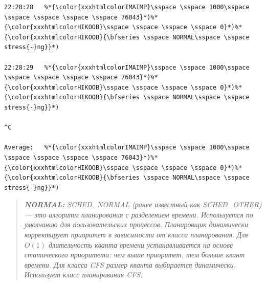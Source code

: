 {\begin{lstlisting}
22:28:28   %*{\color{xxxhtmlcolorIMAIMP}\sspace \sspace 1000\sspace \sspace \sspace \sspace \sspace 76043}*)%*{\color{xxxhtmlcolorHIKOOB}\sspace \sspace \sspace \sspace 0}*)%*{\color{xxxhtmlcolorHIKOOB}{\bfseries \sspace NORMAL\sspace \sspace stress{-}ng}}*)

22:28:29   %*{\color{xxxhtmlcolorIMAIMP}\sspace \sspace 1000\sspace \sspace \sspace \sspace \sspace 76043}*)%*{\color{xxxhtmlcolorHIKOOB}\sspace \sspace \sspace \sspace 0}*)%*{\color{xxxhtmlcolorHIKOOB}{\bfseries \sspace NORMAL\sspace \sspace stress{-}ng}}*)

^C

Average:   %*{\color{xxxhtmlcolorIMAIMP}\sspace \sspace 1000\sspace \sspace \sspace \sspace \sspace 76043}*)%*{\color{xxxhtmlcolorHIKOOB}\sspace \sspace \sspace \sspace 0}*)%*{\color{xxxhtmlcolorHIKOOB}{\bfseries \sspace NORMAL\sspace \sspace stress{-}ng}}*)
\end{lstlisting}}
\begin{quote}
  \textit{
  \textbf{NORMAL:} SCHED\_NORMAL (ранее известный как SCHED\_OTHER) — это алгоритм планирования с разделением времени. Используется по умолчанию для пользовательских процессов. Планировщик динамически корректирует приоритет в зависимости от класса планирования. Для $O(1)$ длительность кванта времени устанавливается на основе статического приоритета: чем выше приоритет, тем больше квант времени. Для класса CFS размер кванта выбирается динамически. Использует класс планирования CFS.
  }
\end{quote}

